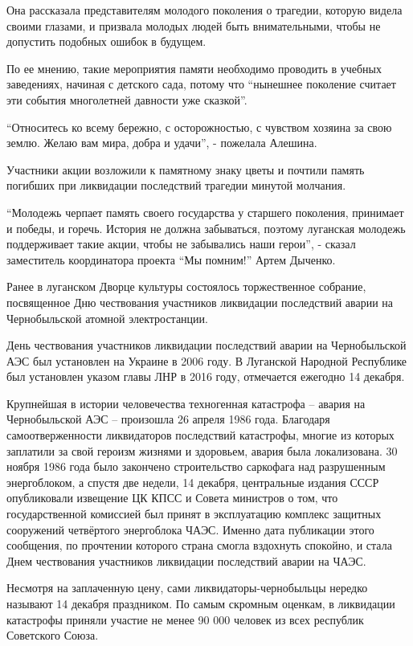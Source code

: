 Она рассказала представителям молодого поколения о трагедии, которую видела
своими глазами, и призвала молодых людей быть внимательными, чтобы не допустить
подобных ошибок в будущем.


По ее мнению, такие мероприятия памяти необходимо проводить в учебных
заведениях, начиная с детского сада, потому что \enquote{нынешнее поколение считает эти
события многолетней давности уже сказкой}.

\enquote{Относитесь ко всему бережно, с осторожностью, с чувством хозяина за свою
землю. Желаю вам мира, добра и удачи}, - пожелала Алешина.

Участники акции возложили к памятному знаку цветы и почтили память погибших при
ликвидации последствий трагедии минутой молчания.

\enquote{Молодежь черпает память своего государства у старшего поколения, принимает и
победы, и горечь. История не должна забываться, поэтому луганская молодежь
поддерживает такие акции, чтобы не забывались наши герои}, - сказал заместитель
координатора проекта \enquote{Мы помним!} Артем Дыченко.

Ранее в луганском Дворце культуры состоялось торжественное собрание,
посвященное Дню чествования участников ликвидации последствий аварии на
Чернобыльской атомной электростанции.

День чествования участников ликвидации последствий аварии на Чернобыльской АЭС
был установлен на Украине в 2006 году. В Луганской Народной Республике был
установлен указом главы ЛНР в 2016 году, отмечается ежегодно 14 декабря.

Крупнейшая в истории человечества техногенная катастрофа – авария на
Чернобыльской АЭС – произошла 26 апреля 1986 года. Благодаря самоотверженности
ликвидаторов последствий катастрофы, многие из которых заплатили за свой
героизм жизнями и здоровьем, авария была локализована. 30 ноября 1986 года было
закончено строительство саркофага над разрушенным энергоблоком, а спустя две
недели, 14 декабря, центральные издания СССР опубликовали извещение ЦК КПСС и
Совета министров о том, что государственной комиссией был принят в эксплуатацию
комплекс защитных сооружений четвёртого энергоблока ЧАЭС. Именно дата
публикации этого сообщения, по прочтении которого страна смогла вздохнуть
спокойно, и стала Днем чествования участников ликвидации последствий аварии на
ЧАЭС.

Несмотря на заплаченную цену, сами ликвидаторы-чернобыльцы нередко называют 14
декабря праздником. По самым скромным оценкам, в ликвидации катастрофы приняли
участие не менее 90 000 человек из всех республик Советского Союза.
